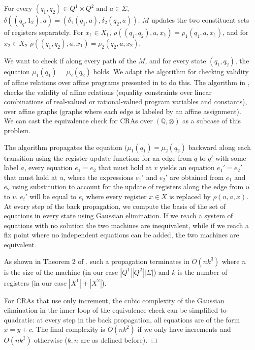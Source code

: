 \documentclass[11pt]{article}
\def\qed{{\bf $\Box$}}
\def\bigO{{O}}
\def\qed{{\bf $\Box$}}
\newcommand{\Rat}{\ensuremath{\mathbb{Q}}}
\newcommand{\inputalph}{\ensuremath{\Sigma}}
\newcommand{\edwa}{\ensuremath{M}}
\newcommand{\edwastates}{\ensuremath{Q}}
\newcommand{\edwavariables}{\ensuremath{X}}
\newcommand{\edwatrans}{\ensuremath{\delta}}
\newcommand{\edwavarup}{\ensuremath{\rho}}
\newcommand{\edwafinal}{\ensuremath{\mu}}
\def\myplus{\otimes}
\begin{document}
For every $(q_1,q_2)\in\edwastates^1\times\edwastates^2$ and
$a\in\Sigma$,
$\edwatrans((q_q,1_2),a)=(\edwatrans_1(q_1,a),\edwatrans_2(q_2,a))$.
$\edwa$ updates the two constituent sets of registers separately. For
$x_1\in\edwavariables_1$,
$\edwavarup((q_1,q_2),a,x_1)=\edwavarup_1(q_1,a,x_1)$, and for
$x_2\in\edwavariables_2$
$\edwavarup((q_1,q_2),a,x_1)=\edwavarup_2(q_2,a,x_2)$.

We want to check if along every path of the $\edwa$, and for every
state $(q_1,q_2)$, the equation $\edwafinal_1(q_1)=\edwafinal_2(q_2)$
holds.  We adapt the algorithm for checking validity of affine
relations over affine programs presented in \cite{olm_note_2004} to do
this. The algorithm in \cite{olm_note_2004}, checks the validity of
affine relations (equality constraints over linear combinations of
real-valued or rational-valued program variables and constants), over
affine graphs (graphs where each edge is labeled by an affine
assignment). We can cast the equivalence check for CRAs over $(\Rat,
\myplus)$ as  a subcase of this problem.

The algorithm propagates the
equation $(\edwafinal_1(q_1)=\edwafinal_2(q_2)$ backward along each
transition using the register update function: for an edge from $q$ to
$q'$ with some label $a$, every equation $e_1=e_2$ that must hold at
$v$ yields an equation $e_1'=e_2'$ that must hold at $u$, where the
expressions $e_1'$ and $e_2'$ are obtained from $e_1$ and $e_2$ using
substitution to account for the update of registers along the edge
from $u$ to $v$.  $e_i'$ will be equal to $e_i$ where every register
$x\in\edwavariables$ is replaced by $\edwavarup(u,a,x)$.  At every
step of the back propagation, we compute the basis of the set of
equations in every state using Gaussian elimination.  If we reach a
system of equations with no solution the two machines are
inequivalent, while if we reach a fix point where no independent
equations can be added, the two machines are equivalent.

As shown in Theorem 2 of \cite{olm_note_2004}, such a propagation
terminates in $\bigO(nk^3)$ where $n$ is the size of the machine (in
our case $|\edwastates^1||\edwastates^2||\inputalph|$) and $k$ is the
number of registers (in our case
$|\edwavariables^1|+|\edwavariables^2|$).



For CRAs that use only increment, the cubic complexity of the Gaussian
elimination in the inner loop of the equivalence check can be
simplified to quadratic: at every step  in the back propagation, all
equations are of the form $x=y+c$.  The final complexity is
$\bigO(nk^2)$
if we only have increments and
$\bigO(nk^3)$
otherwise ($k,n$ are as defined before).
\qed
\end{document}
